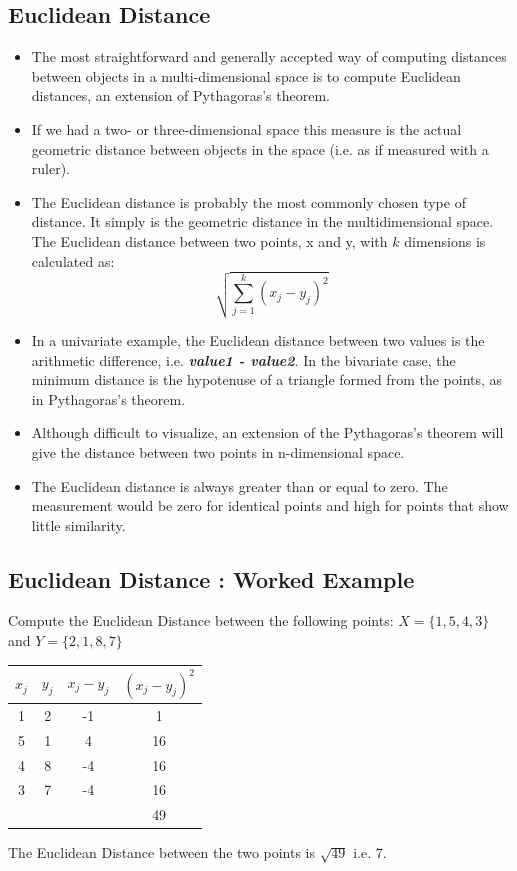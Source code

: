 \documentclass[a4paper,12pt]{report}
\begin{document}
\subsection{Euclidean Distance}
\begin{itemize}
\item The most straightforward and generally accepted way of computing distances between objects in a multi-dimensional space is to compute Euclidean distances, an extension of Pythagoras's theorem.
\item If we had a two- or three-dimensional space this measure is the actual geometric distance between objects in the space (i.e. as if measured with a ruler).
\item The Euclidean distance is probably the most commonly chosen type of distance. It simply is the geometric distance in the multidimensional space. The Euclidean distance between two points, x and y, with $k$ dimensions is calculated as:
\[ \sqrt{ \sum^{k}_{j=1} ( x_j - y_j)^2 } \]

\item 
In a univariate example, the Euclidean distance between two values is the arithmetic difference, i.e. \textbf{\textit{value1 - value2}}. In the bivariate case, the minimum distance is the hypotenuse of a triangle formed from the points, as in Pythagoras's theorem.
\item Although difficult to visualize, an extension of the Pythagoras's theorem will give the distance between two points in n-dimensional space. 

\item 
The Euclidean distance is always greater than or equal to zero. The measurement would be zero for identical points and high for points that show little similarity.
\end{itemize}

\subsection{Euclidean Distance : Worked Example}
Compute the Euclidean Distance between the following points:
$X = \{1,5,4,3\}$ and $Y = \{2,1,8,7\}$

\begin{center}
	\begin{tabular}{|c|c|c|c|}
		\hline
		$x_j$	&	$y_j$	&   $x_j - y_j$	&	$(x_j - y_j)^2$	\\ \hline
		1	&	2	&	-1	&	1	\\
		5	&	1	&	4	&	16	\\
		4	&	8	&	-4	&	16	\\
		3	&	7	&	-4	&	16	\\ \hline
		&		&		&	49	\\ \hline
	\end{tabular}
\end{center}
The Euclidean Distance between the two points is $\sqrt{49}$ i.e. 7.
\end{document}

